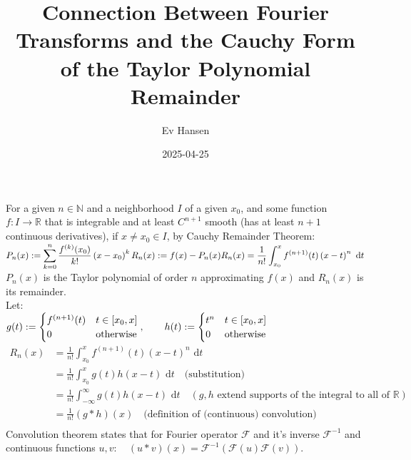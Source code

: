 \documentclass{article}
\title{Connection Between Fourier Transforms and the Cauchy Form of the Taylor Polynomial Remainder}
\author{Ev Hansen}
\date{2025-04-25}
\newcommand{\Nat}{\mathbb N}
\newcommand{\Real}{\mathbb R}
\newcommand{\dispint}{\displaystyle \int}
\newcommand{\dispsum}{\displaystyle \sum}
\begin{document}
	\maketitle
	\newpage
	For a given \(n \in \Nat\) and a neighborhood \( I \) of a given \(x_0\), and some function \(f:I \to \Real\) that is integrable and at least \(C^{n+1}\) smooth (has at least \( n+1 \) continuous derivatives), if \(x \neq x_0 \in I\), by Cauchy Remainder Theorem: \\
	\newline
	\(
		P_n(x) := \dispsum_{k=0}^n \frac{f^{(k)}(x_0)}{k!} \left(x-x_0\right)^k \\
		R_n(x) := f(x) - P_n(x) \\
		R_n(x) = \frac{1}{n!}\dispint_{x_0}^x f^{(n+1)}(t) \left( x - t\right)^n \text{ d}t \\
	\)
	\newline
	\(P_n(x)\) is the Taylor polynomial of order \(n\) approximating \(f(x)\) and \(R_n(x)\) is its remainder. \\
	\newline
	Let: \\
	\(
		g(t) := \begin{cases}
			f^{(n+1)}(t) & t \in [x_0, x] \\
			0 & \text{otherwise}
		\end{cases}, \qquad h(t) := \begin{cases}
			t^n & t \in [x_0, x] \\
			0 & \text{otherwise}
		\end{cases} \\
		\newline
	\)
	\begin{align*}
		R_n(x) &= \frac{1}{n!}\dispint_{x_0}^x f^{(n+1)}(t) \left( x - t\right)^n \text{ d}t \\
		&= \frac{1}{n!}\dispint_{x_0}^x g(t) h(x-t) \text{ d}t \quad \text{(substitution)}\\
		&= \frac{1}{n!}\dispint_{- \infty}^{\infty} g(t) h(x-t) \text{ d}t \quad (g,h \text{ extend supports of the integral to all of } \mathbb R)\\
		&= \frac{1}{n!}(g*h)(x) \quad \text{(definition of (continuous) convolution)} \\
	\end{align*}
	Convolution theorem states that for Fourier operator \(\mathcal F\) and it's inverse \(\mathcal F^{-1}\) and continuous functions \(u,v: \quad (u * v)(x) = \mathcal F^{-1} \left( \mathcal F(u) \mathcal F(v)\right)\). \\
\end{document}
